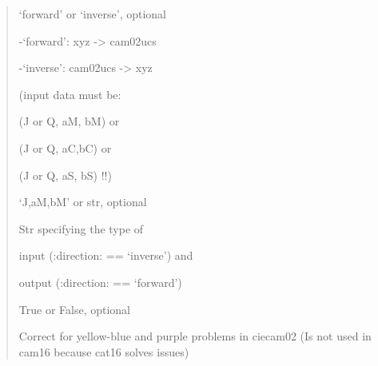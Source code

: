 \documentclass[letterpaper,10pt,english]{sphinxmanual}
\begin{document}
\begin{fulllineitems}
\begin{description}
\begin{quote}
\begin{description}
\item[{direction}] \leavevmode
\begin{DUlineblock}{0em}
\item[] ‘forward’ or ‘inverse’, optional
\item[]
\begin{DUlineblock}{\DUlineblockindent}
\item[] -‘forward’: xyz -\textgreater{} cam02ucs
\item[] -‘inverse’: cam02ucs -\textgreater{} xyz 
\item[]
\begin{DUlineblock}{\DUlineblockindent}
\item[] (input data must be:
\item[]
\begin{DUlineblock}{\DUlineblockindent}
\item[] (J or Q, aM, bM) or 
\item[] (J or Q, aC,bC) or 
\item[] (J or Q, aS, bS) !!)
\end{DUlineblock}
\end{DUlineblock}
\end{DUlineblock}
\end{DUlineblock}

\item[{outin}] \leavevmode
\begin{DUlineblock}{0em}
\item[] ‘J,aM,bM’ or str, optional
\item[] Str specifying the type of 
\item[]
\begin{DUlineblock}{\DUlineblockindent}
\item[] input (:direction: == ‘inverse’) and 
\item[] output (:direction: == ‘forward’)
\end{DUlineblock}
\end{DUlineblock}

\item[{yellowbluepurplecorrect}] \leavevmode
\begin{DUlineblock}{0em}
\item[] True or False, optional
\item[] Correct for yellow-blue and purple problems in ciecam02 
(Is not used in cam16 because cat16 solves issues)
\end{DUlineblock}


\end{description}
\end{quote}
\end{description}
\end{fulllineitems}
\end{document}
